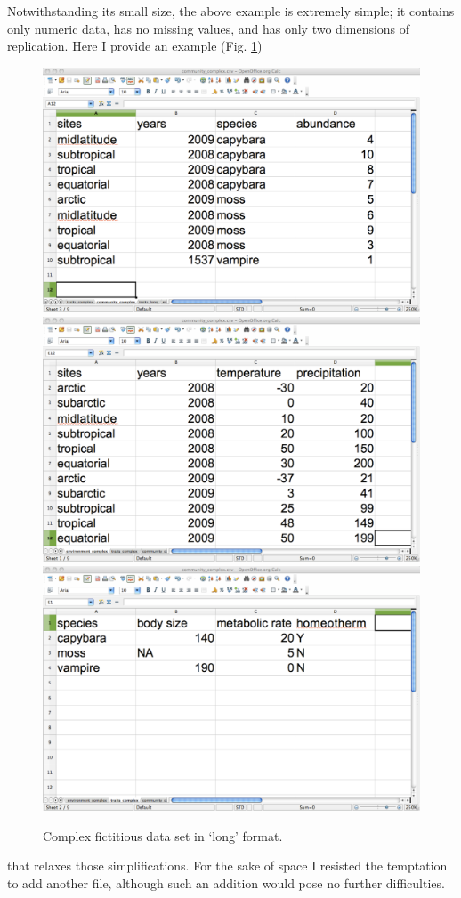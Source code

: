 \documentclass{article}
\numberwithin{exercise}{section}
\begin{document}
Notwithstanding its small size, the above example is extremely simple; it contains only numeric data, has no missing values, and has only two dimensions of replication.  Here I provide an example (Fig. \ref{fig:complexspreadsheet}) \begin{figure}
\includegraphics{./readingmultipletables/community_complex.pdf}
\includegraphics{./readingmultipletables/environment_complex.pdf}
\includegraphics{./readingmultipletables/traits_complex.pdf}
\caption{Complex fictitious data set in `long' format.}
\label{fig:complexspreadsheet}
\end{figure}that relaxes those simplifications.  For the sake of space I resisted the temptation to add another file, although such an addition would pose no further difficulties.
\end{document}
